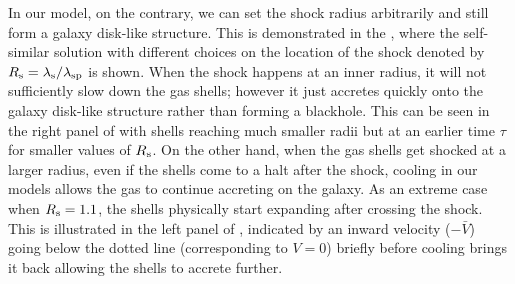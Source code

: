 In our model, on the contrary, we can set the shock radius arbitrarily and still form a galaxy disk-like structure. This is demonstrated in the , where the self-similar solution with different choices on the location of the shock denoted by $R_{\rm s} = \lambda_{\rm s}/ \lambda_{\rm sp}$ is shown. When the shock happens at an inner radius, it will not sufficiently slow down the gas shells; however it just accretes quickly onto the galaxy disk-like structure rather than forming a blackhole. This can be seen in the right panel of  with shells reaching much smaller radii but at an earlier time $\tau$ for smaller values of $R_{\rm s}$. On the other hand, when the gas shells get shocked at a larger radius, even if the shells come to a halt after the shock, cooling in our models allows the gas to continue accreting on the galaxy. As an extreme case when $R_{\rm s}=1.1$, the shells physically start expanding after crossing the shock. This is illustrated in the left panel of , indicated by an inward velocity ($-\bar{V}$) going below the dotted line (corresponding to $V=0$) briefly before cooling brings it back allowing the shells to accrete further. 


